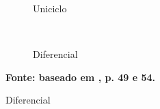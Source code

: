 \begin{figure}[h]
\centering
\caption{Modelos uniciclo e diferencial} \label{fig:modelo}
	\begin{subfigure}[t]{0.5\textwidth}%
		\centering
		\robounicicloinercial
		\label{fig:uniciclo}%
		\caption{Uniciclo}%
		\end{subfigure}%
    	~
    	\begin{subfigure}[t]{0.5\textwidth}%
		\centering
		\robodiffinercial
		\label{fig:diff}%
		\caption{Diferencial}%
		\end{subfigure}%
		
		\textbf{Fonte: baseado em , p. 49 e 54.}
\end{figure}

